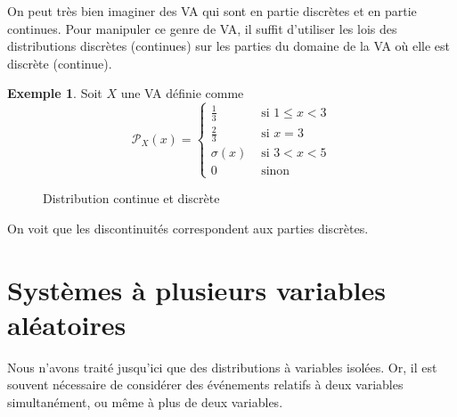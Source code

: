 \documentclass[a4paper,12pt]{report}
\theoremstyle{definition}
\renewcommand{\(}{\left(}
\renewcommand{\)}{\right)}
\renewcommand{\P}{\mathcal{P}}
\renewcommand{\t}{\text}
\newtheorem{exmp}[thm]{Exemple}
\begin{document}
        On peut très bien imaginer des VA qui sont en partie discrètes et en partie continues. Pour manipuler ce genre de VA, il suffit d'utiliser les lois des distributions discrètes (continues) sur les parties du domaine de la VA où elle est discrète (continue).

        \begin{exmp}
            Soit $X$ une VA définie comme 
            $$\P_X(x) = 
            \begin{cases}
            \frac{1}{3} & \t{ si } 1\leq x < 3\\
            \frac{2}{3} & \t{ si } x = 3\\
            \sigma(x) & \t{ si } 3 < x < 5\\
            0 & \t{ sinon}
            \end{cases}$$
            
            \begin{figure}[H]
                \centering
                \caption{Distribution continue et discrète} 
            \end{figure}
            
            On voit que les discontinuités correspondent aux parties discrètes.
        \end{exmp}
        
\chapter{Systèmes à plusieurs variables aléatoires}
    Nous n'avons traité jusqu'ici que des distributions à variables isolées. Or, il est souvent nécessaire de considérer des événements relatifs à deux variables simultanément, ou même à plus de deux variables.
\end{document}
